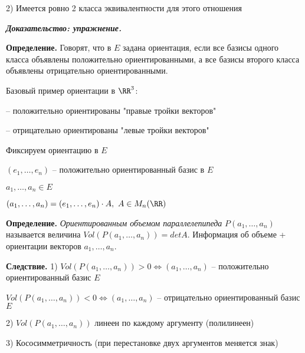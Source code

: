 2) Имеется ровно 2 класса эквивалентности для этого отношения

\bigskip
\textbf{\textit{Доказательство: упражнение.}}

\bigskip
\textbf{Определение.} Говорят, что в $E$ задана ориентация, если все базисы одного класса объявлены положительно ориентированными, а все базисы второго класса объявлены отрицательно ориентированными.

\bigskip
Базовый пример ориентации в $\RR^3$:

-- положительно ориентированы "правые тройки векторов"

-- отрицательно ориентированы "левые тройки векторов"

\bigskip
Фиксируем ориентацию в $E$

$(e_1, \dots, e_n)$ -- положительно ориентированный базис в $E$

\bigskip
$a_1, \dots, a_n \in E$

$(a_1, \dots, a_n) = (e_1, \dots, e_n) \cdot A, \ A \in M_n(\RR)$

\bigskip
\textbf{Определение.} \textit{Ориентированным объемом параллелепипеда} $P(a_1, \dots, a_n)$ называется величина $Vol(P(a_1, \dots, a_n)) = det A$. Информация об объеме + ориентации векторов $a_1, \dots, a_n$.

\bigskip
\textbf{Следствие.} 1) $Vol(P(a_1, \dots, a_n)) > 0 \Leftrightarrow (a_1, \dots, a_n)$ -- положительно ориентированный базис $E$

$Vol(P(a_1, \dots, a_n)) < 0 \Leftrightarrow (a_1, \dots, a_n)$ -- отрицательно ориентированный базис $E$

2) $Vol(P(a_1, \dots, a_n))$ линеен по каждому аргументу (полилинеен)

3) Кососимметричность (при перестановке двух аргументов меняется знак)

